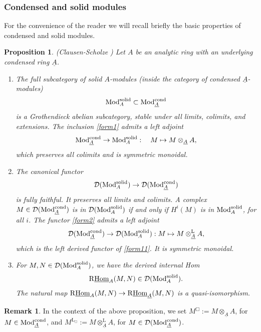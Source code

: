 \documentclass[10pt]{amsart}
\newtheorem{proposition}[equation]{Proposition}
\theoremstyle{definition}
\newtheorem{remark}[equation]{Remark}
\theoremstyle{remark}
\newcommand{\uHom}{\underline{{\rm{Hom}} }}
\newcommand{\LL}{\operatorname{L} }
\newcommand{\sd}{{\mathcal{D}}}
\numberwithin{equation}{section}
\def\R{{\mathrm R}}
\numberwithin{equation}{section}
\begin{document}
\subsubsection{Condensed and solid modules} \label{naive1a} For the convenience of the reader we will recall  briefly  the basic properties of condensed and solid modules. 

\begin{proposition}{\rm (Clausen-Scholze \cite[Prop. 7.5]{Sch19})} \label{nyear1} Let $A$ be an   analytic ring with an underlying condensed ring $\underline{A}$. 
\begin{enumerate}
 \item  The full subcategory of solid $ A$-modules (inside the category of condensed $\underline{A}$-modules)
\begin{equation}
 \label{form1}{\rm Mod}^{\rm solid}_{A}\subset  {\rm Mod}^{\rm cond}_{\underline{A }}
 \end{equation}
is a Grothendieck   abelian subcategory,   stable under all limits, colimits, and extensions.  The
inclusion \eqref{form1} admits a left adjoint
\begin{equation}
 \label{form11}
 {\rm Mod}^{\rm cond}_{\underline{A}}\to  {\rm Mod}^{\rm solid}_{A} : \quad M \mapsto M \otimes_{\underline{A}} A, 
 \end{equation}
which   preserves all colimits and is  symmetric monoidal. 
\item  The canonical  functor 
\begin{equation}
\label{form2}
\sd({\rm Mod}^{\rm solid}_{A})
\to  \sd({\rm Mod}^{\rm cond}_{\underline{A}}) 
\end{equation}
is  fully faithful. It preserves all limits and colimits. 
A complex  $M \in \sd({\rm Mod}^{\rm cond}_{\underline{A}})$ is in $\sd({\rm Mod}^{\rm solid}_{A})$ if and only if $H^i(M)$
is in ${\rm Mod}^{\rm solid}_{A}$, for all $i$. The functor \eqref{form2}  admits a left adjoint
\begin{equation}
\label{form3}
\sd({\rm Mod}^{\rm cond}_{\underline{A}}) \to \sd({\rm Mod}^{\rm solid}_{A}) : M\mapsto M\otimes^{\rm L}_{\underline{A}}A, 
\end{equation}
which  is the left derived functor of \eqref{form11}. It is symmetric
monoidal.
\item For  $M, N \in \sd({\rm Mod}^{\rm solid}_{A})$, we have  the derived internal Hom $$\R{\uHom}_{A}(M,N)\in\sd({\rm Mod}^{\rm solid}_{A}).$$
The natural map
$\R{\uHom}_{A}(M,N) \to  \R{\uHom}_{\underline{A}}(M,N)$
is a quasi-isomorphism.
\end{enumerate}
\end{proposition}
\begin{remark}
In the context of the above proposition, we set $M^{\Box}:=M\otimes_{\underline{A}}A$, for $M\in{\rm Mod}^{\rm cond}_{\underline{A}}$, and $M^{\LL_{\Box}}:=M\otimes^{\LL}_{\underline{A}}A$, for 
$M\in\sd({\rm Mod}^{\rm cond}_{\underline{A}})$.
\end{remark}
\end{document}
